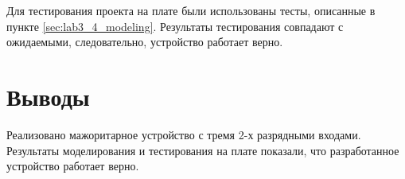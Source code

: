 Для тестирования проекта на плате были использованы тесты, описанные в пункте \ref{sec:lab3_4_modeling}. Результаты тестирования совпадают с ожидаемыми, следовательно, устройство работает верно.

\section{Выводы}

Реализовано мажоритарное устройство с тремя 2-х разрядными входами. Результаты моделирования и тестирования на плате показали, что разработанное устройство работает верно.
